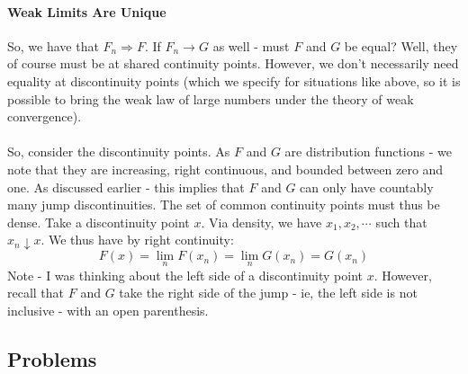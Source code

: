 \documentclass[12pt,a4paper]{article}
\newcommand{\1}[1]{\mathbbm{1}\left\{ #1 \right\}}
\begin{document}
\paragraph{Weak Limits Are Unique} So, we have that $F_n \Rightarrow F$. If $F_n \rightarrow G$ as well - must $F$ and $G$ be equal? Well, they of course must be at shared continuity points. However, we don't necessarily need equality at discontinuity points (which we specify for situations like above, so it is possible to bring the weak law of large numbers under the theory of weak convergence). 
\\\\
So, consider the discontinuity points. As $F$ and $G$ are distribution functions - we note that they are increasing, right continuous, and bounded between zero and one. As discussed earlier - this implies that $F$ and $G$ can only have countably many jump discontinuities. The set of common continuity points must thus be dense. Take a discontinuity point $x$. Via density, we have $x_1, x_2, \cdots$ such that $x_n \downarrow x$. We thus have by right continuity:
$$
	F(x) = \lim_n F(x_n) = \lim_n G(x_n) = G(x_n)
$$
Note - I was thinking about the left side of a discontinuity point $x$. However, recall that $F$ and $G$ take the right side of the jump - ie, the left side is not inclusive - with an open parenthesis.

\subsection{Problems}
\end{document}
